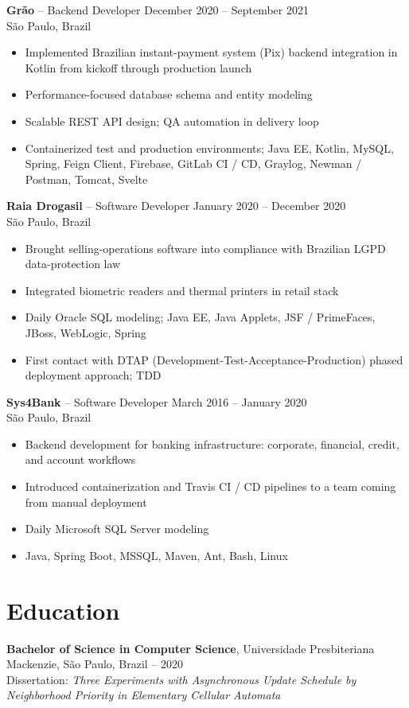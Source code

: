 \documentclass[11pt,a4paper]{article}
\begin{document}
\noindent\textbf{Grão} -- Backend Developer \hfill December 2020 -- September 2021\\
São Paulo, Brazil
\begin{itemize}
\item Implemented Brazilian instant-payment system (Pix) backend integration in Kotlin from kickoff through production launch
\item Performance-focused database schema and entity modeling
\item Scalable REST API design; QA automation in delivery loop
\item Containerized test and production environments; Java EE, Kotlin, MySQL, Spring, Feign Client, Firebase, GitLab CI / CD, Graylog, Newman / Postman, Tomcat, Svelte
\end{itemize}

\noindent\textbf{Raia Drogasil} -- Software Developer \hfill January 2020 -- December 2020\\
São Paulo, Brazil
\begin{itemize}
\item Brought selling-operations software into compliance with Brazilian LGPD data-protection law
\item Integrated biometric readers and thermal printers in retail stack
\item Daily Oracle SQL modeling; Java EE, Java Applets, JSF / PrimeFaces, JBoss, WebLogic, Spring
\item First contact with DTAP (Development-Test-Acceptance-Production) phased deployment approach; TDD
\end{itemize}

\noindent\textbf{Sys4Bank} -- Software Developer \hfill March 2016 -- January 2020\\
São Paulo, Brazil
\begin{itemize}
\item Backend development for banking infrastructure: corporate, financial, credit, and account workflows
\item Introduced containerization and Travis CI / CD pipelines to a team coming from manual deployment
\item Daily Microsoft SQL Server modeling
\item Java, Spring Boot, MSSQL, Maven, Ant, Bash, Linux
\end{itemize}

\section{Education}
\noindent\textbf{Bachelor of Science in Computer Science}, Universidade Presbiteriana Mackenzie, São Paulo, Brazil -- 2020\\
Dissertation: \textit{Three Experiments with Asynchronous Update Schedule by Neighborhood Priority in Elementary Cellular Automata}
\end{document}
